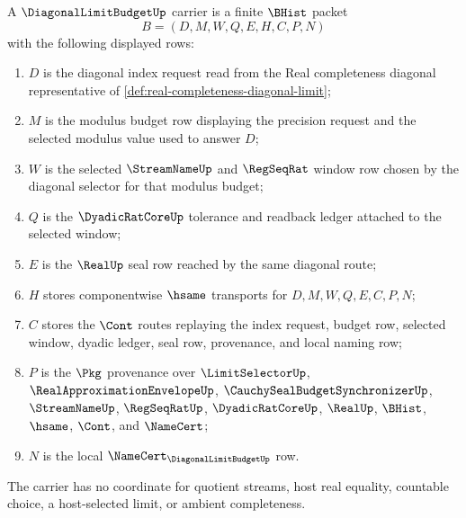 \begin{definition}
\label{def:diagonal-limit-budget-carrier}
A $\DiagonalLimitBudgetUp$ carrier is a finite $\BHist$ packet
$$
B=(D,M,W,Q,E,H,C,P,N)
$$
with the following displayed rows:
\begin{enumerate}
\item $D$ is the diagonal index request read from the Real completeness diagonal representative of \autoref{def:real-completeness-diagonal-limit};
\item $M$ is the modulus budget row displaying the precision request and the selected modulus value used to answer $D$;
\item $W$ is the selected $\StreamNameUp$ and $\RegSeqRat$ window row chosen by the diagonal selector for that modulus budget;
\item $Q$ is the $\DyadicRatCoreUp$ tolerance and readback ledger attached to the selected window;
\item $E$ is the $\RealUp$ seal row reached by the same diagonal route;
\item $H$ stores componentwise $\hsame$ transports for $D,M,W,Q,E,C,P,N$;
\item $C$ stores the $\Cont$ routes replaying the index request, budget row, selected window, dyadic ledger, seal row, provenance, and local naming row;
\item $P$ is the $\Pkg$ provenance over $\LimitSelectorUp$, $\RealApproximationEnvelopeUp$, $\CauchySealBudgetSynchronizerUp$, $\StreamNameUp$, $\RegSeqRatUp$, $\DyadicRatCoreUp$, $\RealUp$, $\BHist$, $\hsame$, $\Cont$, and $\NameCert$;
\item $N$ is the local $\NameCert_{\DiagonalLimitBudgetUp}$ row.
\end{enumerate}
The carrier has no coordinate for quotient streams, host real equality, countable choice, a host-selected limit, or ambient completeness.
\end{definition}

